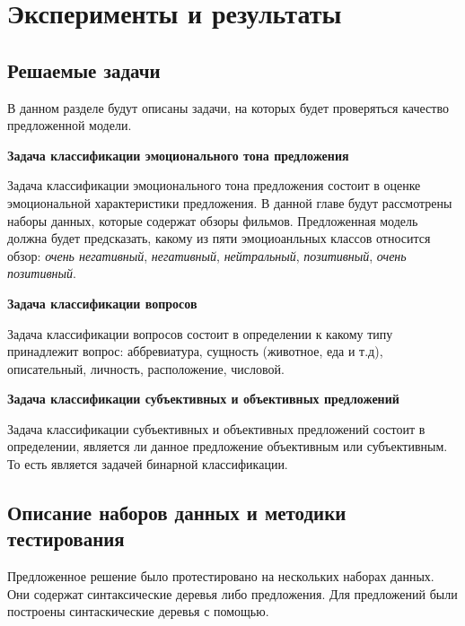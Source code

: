 
\chapter{Эксперименты и результаты}

\section{Решаемые задачи}
В данном разделе будут описаны задачи, на которых будет проверяться качество предложенной модели.
\vspace{5mm}

\noindent \textbf{Задача классификации эмоционального тона предложения}\par
Задача классификации эмоционального тона предложения состоит в оценке эмоциональной характеристики предложения. В данной главе будут рассмотрены наборы данных, которые содержат обзоры фильмов. 
Предложенная модель должна будет предсказать, какому из пяти эмоциоанльных классов относится обзор:
\emph{очень негативный}, \emph{негативный}, \emph{нейтральный}, \emph{позитивный}, \emph{очень позитивный}.
\vspace{5mm}

\noindent \textbf{Задача классификации вопросов}\par
Задача классификации вопросов состоит в определении к какому типу принадлежит вопрос:
аббревиатура, сущность (животное, еда и т.д), описательный, личность, расположение, числовой.
\vspace{5mm}

\noindent \textbf{Задача классификации субъективных и объективных предложений}\par
Задача классификации субъективных и объективных предложений состоит в определении, является ли данное предложение объективным или субъективным. То есть является задачей бинарной классификации.

\section{Описание наборов данных и методики тестирования}
Предложенное решение было протестировано на нескольких наборах данных. 
Они содержат синтаксические деревья либо предложения. 
Для предложений были построены синтаскические деревья с помощью\cite{lex-parser}.
\vspace{5mm}

